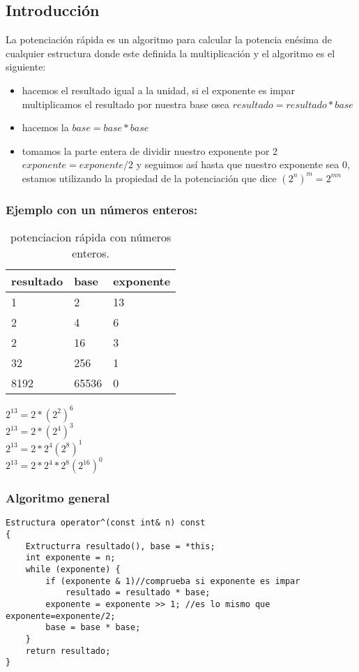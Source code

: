 \subsection{Introducción}
La potenciación rápida es un algoritmo para calcular la potencia enésima de cualquier estructura donde este definida la multiplicación y el algoritmo es el siguiente:
\begin{itemize}
\item hacemos el resultado igual a la unidad, si el exponente es impar multiplicamos el resultado por nuestra base  osea $resultado = resultado * base$
\item hacemos la $base =  base * base$
\item tomamos la parte entera de dividir nuestro exponente por 2 $exponente=exponente/2$  y seguimos así hasta que nuestro exponente sea 0, estamos utilizando la propiedad de la potenciación que dice $\left ( 2^{n} \right )^m=2^{mn}$
\end{itemize}

\subsubsection{Ejemplo con un números enteros:}

\begin{table}[htbp]
\begin{center}
\begin{tabular}{|l|l|l|}
\hline
resultado & base & exponente \\
\hline \hline
1 &	2 &	13 \\ \hline
2 &	4 &	6 \\ \hline
2	& 16 & 3 \\ \hline
32 &	256 &	1 \\ \hline
8192 &	65536 &	0 \\ \hline
\end{tabular}
\caption{potenciacion rápida con números enteros.}
\label{tabla:ejemplo}
\end{center}
\end{table}
$2^{13}=2*\left ( 2^{2} \right )^{6}$
\\$2^{13}=2*\left ( 2^{4} \right )^3$
\\$2^{13}=2*2^{4}\left ( 2^{8} \right )^1$
\\$2^{13}=2*2^{4}*2^{8} \left ( 2^{16} \right )^0$


\subsubsection{Algoritmo general}
\begin{minipage}{\textwidth}
\begin{lstlisting}[style=C,caption=operadorPotencia]
Estructura operator^(const int& n) const
{
    Extructurra resultado(), base = *this;
    int exponente = n;
    while (exponente) {
        if (exponente & 1)//comprueba si exponente es impar
            resultado = resultado * base;
        exponente = exponente >> 1; //es lo mismo que exponente=exponente/2;
        base = base * base;
    }
    return resultado;
}
\end{lstlisting}
\end{minipage}
